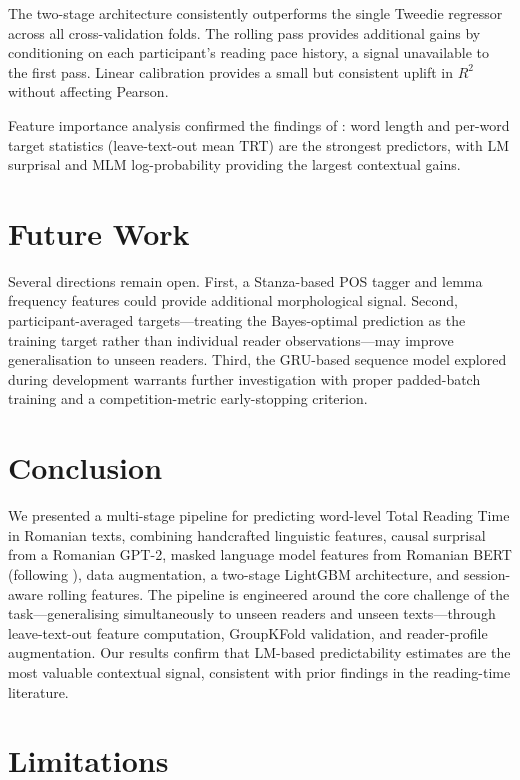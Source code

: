 \documentclass[12pt]{article}
\begin{document}
The two-stage architecture consistently outperforms the single Tweedie regressor across all cross-validation folds. The rolling pass provides additional gains by conditioning on each participant's reading pace history, a signal unavailable to the first pass. Linear calibration provides a small but consistent uplift in $R^2$ without affecting Pearson.

Feature importance analysis confirmed the findings of \citet{hodivoianu2025predicting}: word length and per-word target statistics (leave-text-out mean TRT) are the strongest predictors, with LM surprisal and MLM log-probability providing the largest contextual gains.

\section{Future Work}

Several directions remain open. First, a Stanza-based POS tagger and lemma frequency features could provide additional morphological signal. Second, participant-averaged targets---treating the Bayes-optimal prediction as the training target rather than individual reader observations---may improve generalisation to unseen readers. Third, the GRU-based sequence model explored during development warrants further investigation with proper padded-batch training and a competition-metric early-stopping criterion.

\section{Conclusion}

We presented a multi-stage pipeline for predicting word-level Total Reading Time in Romanian texts, combining handcrafted linguistic features, causal surprisal from a Romanian GPT-2, masked language model features from Romanian BERT (following \citealt{hodivoianu2025predicting}), data augmentation, a two-stage LightGBM architecture, and session-aware rolling features. The pipeline is engineered around the core challenge of the task---generalising simultaneously to unseen readers and unseen texts---through leave-text-out feature computation, GroupKFold validation, and reader-profile augmentation. Our results confirm that LM-based predictability estimates are the most valuable contextual signal, consistent with prior findings in the reading-time literature.

\section{Limitations}
\end{document}
